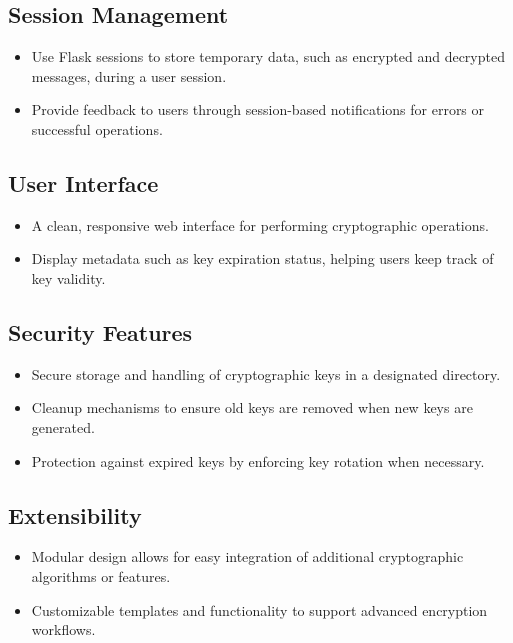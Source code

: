 \documentclass[12pt]{article}
\begin{document}
\subsection*{Session Management}
\begin{itemize}
    \item Use Flask sessions to store temporary data, such as encrypted and decrypted messages, during a user session.
    \item Provide feedback to users through session-based notifications for errors or successful operations.
\end{itemize}

\subsection*{User Interface}
\begin{itemize}
    \item A clean, responsive web interface for performing cryptographic operations.
    \item Display metadata such as key expiration status, helping users keep track of key validity.
\end{itemize}

\subsection*{Security Features}
\begin{itemize}
    \item Secure storage and handling of cryptographic keys in a designated directory.
    \item Cleanup mechanisms to ensure old keys are removed when new keys are generated.
    \item Protection against expired keys by enforcing key rotation when necessary.
\end{itemize}

\subsection*{Extensibility}
\begin{itemize}
    \item Modular design allows for easy integration of additional cryptographic algorithms or features.
    \item Customizable templates and functionality to support advanced encryption workflows.
\end{itemize}


\end{document}
